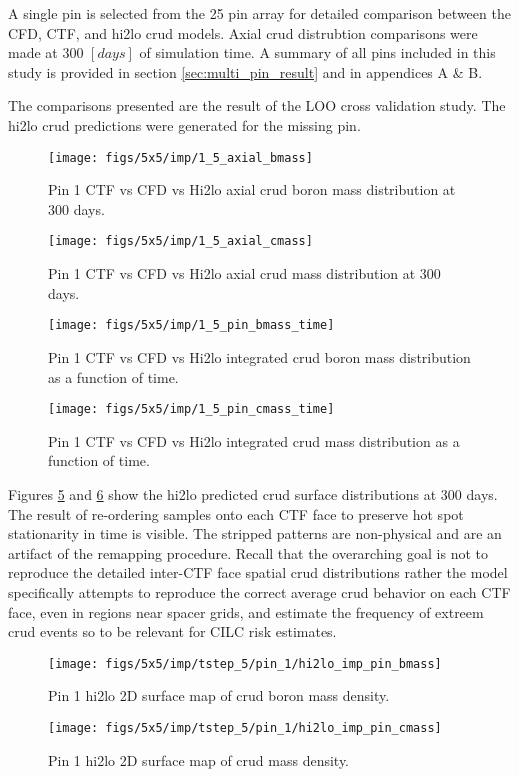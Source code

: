 A single pin is selected from the 25 pin array for detailed comparison between the CFD, CTF, and hi2lo crud models.  Axial crud distrubtion comparisons were made at 300 $[days]$ of simulation time.  A summary of all pins included in this study is provided in section \ref{sec:multi_pin_result} and in appendices A \& B.

The comparisons presented are the result of the LOO cross validation study.  The hi2lo crud predictions were generated for the missing pin.


\begin{figure}[H]
    \centering
    \texttt{[image: figs/5x5/imp/1\_5\_axial\_bmass]}
    \caption{Pin 1 CTF vs CFD vs Hi2lo axial crud boron mass distribution at 300 days.}
    \label{fig:15axialbmass}
\end{figure}
\begin{figure}[H]
    \centering
    \texttt{[image: figs/5x5/imp/1\_5\_axial\_cmass]}
    \caption{Pin 1 CTF vs CFD vs Hi2lo axial crud mass distribution at 300 days.}
    \label{fig:15axialcmass}
\end{figure}
\begin{figure}[H]
    \centering
    \texttt{[image: figs/5x5/imp/1\_5\_pin\_bmass\_time]}
    \caption{Pin 1 CTF vs CFD vs Hi2lo integrated crud boron mass distribution as a function of time.}
    \label{fig:15pinbmasstime}
\end{figure}
\begin{figure}[H]
    \centering
    \texttt{[image: figs/5x5/imp/1\_5\_pin\_cmass\_time]}
    \caption{Pin 1 CTF vs CFD vs Hi2lo integrated crud mass distribution as a function of time.}
    \label{fig:15pincmasstime}
\end{figure}

Figures \ref{fig:2d_hi2loimppinbmass} and \ref{fig:2d_hi2loimppincmass} show the hi2lo predicted crud surface distributions at 300 days.  The result of re-ordering samples onto each CTF face to preserve hot spot stationarity in time is visible.  The stripped patterns are non-physical and are an artifact of the remapping procedure.  Recall that the overarching goal is not to reproduce the detailed inter-CTF face spatial crud distributions rather the model specifically attempts to reproduce the correct average crud behavior on each CTF face, even in regions near spacer grids, and estimate the frequency of extreem crud events so to be relevant for CILC risk estimates.


\begin{figure}[H]
    \centering
    \texttt{[image: figs/5x5/imp/tstep\_5/pin\_1/hi2lo\_imp\_pin\_bmass]}
    \caption{Pin 1 hi2lo 2D surface map of crud boron mass density.}
    \label{fig:2d_hi2loimppinbmass}
\end{figure}
\begin{figure}[H]
    \centering
    \texttt{[image: figs/5x5/imp/tstep\_5/pin\_1/hi2lo\_imp\_pin\_cmass]}
    \caption{Pin 1 hi2lo 2D surface map of crud mass density.}
    \label{fig:2d_hi2loimppincmass}
\end{figure}


